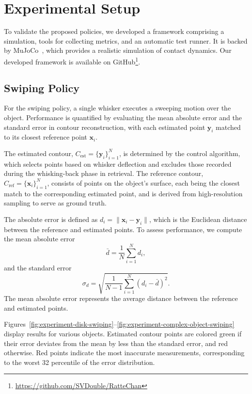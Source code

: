 

\chapter{Experimental Setup}

To validate the proposed policies, we developed a framework comprising a simulation, tools for collecting metrics, and an automatic test runner.
It is backed by MuJoCo~\cite{todorov2012mujoco}, which provides a realistic simulation of contact dynamics.
Our developed framework is available on GitHub\footnote{\url{https://github.com/SVDouble/RatteChan}}.


\section{Swiping Policy} \label{sec:swiping-policy}

For the swiping policy, a single whisker executes a sweeping motion over the object.
Performance is quantified by evaluating the mean absolute error and the standard error in contour reconstruction, with each estimated point $\mathbf{y}_i$ matched to its closest reference point $\mathbf{x}_i$.

The estimated contour, $C_{\text{est}} = \{\mathbf{y}_i\}_{i=1}^N$, is determined by the control algorithm, which selects points based on whisker deflection and excludes those recorded during the whisking-back phase in retrieval.
The reference contour, $C_{\text{ref}} = \{\mathbf{x}_i\}_{i=1}^N$, consists of points on the object's surface, each being the closest match to the corresponding estimated point, and is derived from high-resolution sampling to serve as ground truth.

The absolute error is defined as $d_i = \|\mathbf{x}_i - \mathbf{y}_i\|$, which is the Euclidean distance between the reference and estimated points.
To assess performance, we compute the mean absolute error
\[
    \bar{d} = \frac{1}{N}\sum_{i=1}^{N} d_i,
\]
and the standard error
\[
    \sigma_d = \sqrt{\frac{1}{N-1}\sum_{i=1}^{N} (d_i - \bar{d})^2}.
\]
The mean absolute error represents the average distance between the reference and estimated points.

Figures~\ref{fig:experiment-disk-swiping}--\ref{fig:experiment-complex-object-swiping} display results for various objects.
Estimated contour points are colored green if their error deviates from the mean by less than the standard error, and red otherwise.
Red points indicate the most inaccurate measurements, corresponding to the worst 32 percentile of the error distribution.

